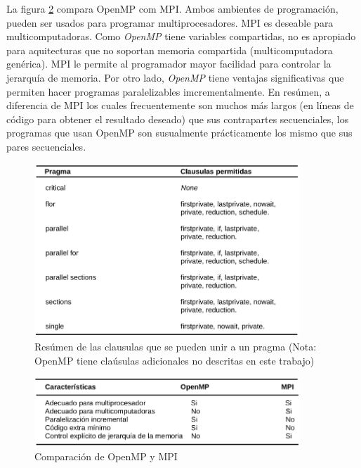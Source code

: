 \documentclass[12pt,letterpaper]{book}
\begin{document}
La figura \ref{fig:comp_opemp_mpi} compara OpenMP com MPI. Ambos ambientes de programación, pueden ser usados para programar multiprocesadores. MPI es deseable para multicomputadoras. Como \textit{OpenMP} tiene variables compartidas, no es apropiado para aquitecturas que no soportan memoria compartida (multicomputadora genérica). MPI le permite al programador mayor facilidad para controlar la jerarquía de memoria. Por otro lado, \textit{OpenMP} tiene ventajas significativas que permiten hacer programas paralelizables imcrementalmente. En resúmen, a diferencia de MPI los cuales frecuentemente son muchos más largos (en líneas de código para obtener el resultado deseado) que sus contrapartes secuenciales,  los programas que usan OpenMP son susualmente prácticamente los mismo que sus pares secuenciales.

\begin{figure}
\begin{center}
\includegraphics[width=10cm]{../imagenes/pragmas_clausulas.png} 
\end{center}
\caption{Resúmen de las clausulas que se pueden unir a un pragma (Nota: OpenMP tiene claúsulas adicionales no descritas en este trabajo)}
\label{fig:pragmas_clausulas}
\end{figure}

\begin{figure}
\begin{center}
\includegraphics[width=10cm]{../imagenes/comp_opemp_mpi.png} 
\end{center}
\caption{Comparación de OpenMP y MPI}
\label{fig:comp_opemp_mpi}
\end{figure}
\end{document}
